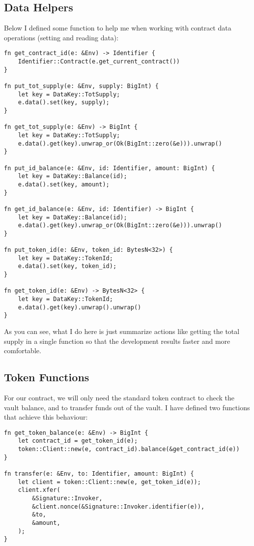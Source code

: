 \documentclass{article}
\begin{document}
\subsection{Data Helpers}
Below I defined some function to help me when working with contract data operations (setting and reading data):

\begin{lstlisting}
fn get_contract_id(e: &Env) -> Identifier {
    Identifier::Contract(e.get_current_contract())
}

fn put_tot_supply(e: &Env, supply: BigInt) {
    let key = DataKey::TotSupply;
    e.data().set(key, supply);
}

fn get_tot_supply(e: &Env) -> BigInt {
    let key = DataKey::TotSupply;
    e.data().get(key).unwrap_or(Ok(BigInt::zero(&e))).unwrap()
}

fn put_id_balance(e: &Env, id: Identifier, amount: BigInt) {
    let key = DataKey::Balance(id);
    e.data().set(key, amount);
}

fn get_id_balance(e: &Env, id: Identifier) -> BigInt {
    let key = DataKey::Balance(id);
    e.data().get(key).unwrap_or(Ok(BigInt::zero(&e))).unwrap()
}

fn put_token_id(e: &Env, token_id: BytesN<32>) {
    let key = DataKey::TokenId;
    e.data().set(key, token_id);
}

fn get_token_id(e: &Env) -> BytesN<32> {
    let key = DataKey::TokenId;
    e.data().get(key).unwrap().unwrap()
}
\end{lstlisting}

As you can see, what I do here is just summarize actions like getting the total supply in a single function so that the development results faster and more comfortable.

\subsection{Token Functions}
For our contract, we will only need the standard token contract to check the vault balance, and to transfer funds out of the vault. I have defined two functions that achieve this behaviour:

\begin{lstlisting}
fn get_token_balance(e: &Env) -> BigInt {
    let contract_id = get_token_id(e);
    token::Client::new(e, contract_id).balance(&get_contract_id(e))
}

fn transfer(e: &Env, to: Identifier, amount: BigInt) {
    let client = token::Client::new(e, get_token_id(e));
    client.xfer(
        &Signature::Invoker,
        &client.nonce(&Signature::Invoker.identifier(e)),
        &to,
        &amount,
    );
}
\end{lstlisting}
\end{document}
